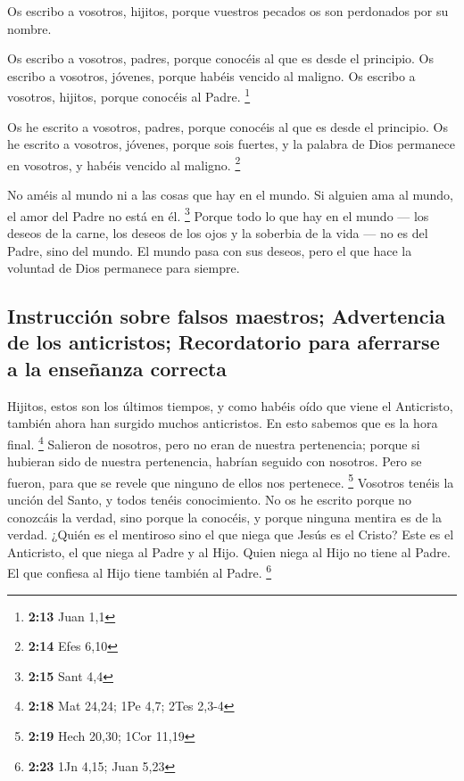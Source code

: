 \begin{paracol}{2}
 Os escribo a vosotros, hijitos, porque vuestros pecados
os son perdonados por su nombre.

 Os escribo a vosotros, padres, porque conocéis al que es
desde el principio. Os escribo a vosotros, jóvenes, porque habéis
vencido al maligno. Os escribo a vosotros, hijitos, porque conocéis al
Padre. \footnote{\textbf{2:13} Juan 1,1}

 Os he escrito a vosotros, padres, porque conocéis al que
es desde el principio. Os he escrito a vosotros, jóvenes, porque sois
fuertes, y la palabra de Dios permanece en vosotros, y habéis vencido al
maligno. \footnote{\textbf{2:14} Efes 6,10}

 No améis al mundo ni a las cosas que hay en el mundo. Si
alguien ama al mundo, el amor del Padre no está en él. \footnote{\textbf{2:15}
  Sant 4,4}  Porque todo lo que hay en el mundo --- los
deseos de la carne, los deseos de los ojos y la soberbia de la vida ---
no es del Padre, sino del mundo.  El mundo pasa con sus
deseos, pero el que hace la voluntad de Dios permanece para siempre.

\hypertarget{instrucciuxf3n-sobre-falsos-maestros-advertencia-de-los-anticristos-recordatorio-para-aferrarse-a-la-enseuxf1anza-correcta}{%
\subsection{Instrucción sobre falsos maestros; Advertencia de los
anticristos; Recordatorio para aferrarse a la enseñanza
correcta}\label{instrucciuxf3n-sobre-falsos-maestros-advertencia-de-los-anticristos-recordatorio-para-aferrarse-a-la-enseuxf1anza-correcta}}

 Hijitos, estos son los últimos tiempos, y como habéis
oído que viene el Anticristo, también ahora han surgido muchos
anticristos. En esto sabemos que es la hora final. \footnote{\textbf{2:18}
  Mat 24,24; 1Pe 4,7; 2Tes 2,3-4}  Salieron de nosotros,
pero no eran de nuestra pertenencia; porque si hubieran sido de nuestra
pertenencia, habrían seguido con nosotros. Pero se fueron, para que se
revele que ninguno de ellos nos pertenece. \footnote{\textbf{2:19} Hech
  20,30; 1Cor 11,19}  Vosotros tenéis la unción del
Santo, y todos tenéis conocimiento.  No os he escrito
porque no conozcáis la verdad, sino porque la conocéis, y porque ninguna
mentira es de la verdad.  ¿Quién es el mentiroso sino el
que niega que Jesús es el Cristo? Este es el Anticristo, el que niega al
Padre y al Hijo.  Quien niega al Hijo no tiene al Padre.
El que confiesa al Hijo tiene también al Padre. \footnote{\textbf{2:23}
  1Jn 4,15; Juan 5,23}


\end{paracol}
